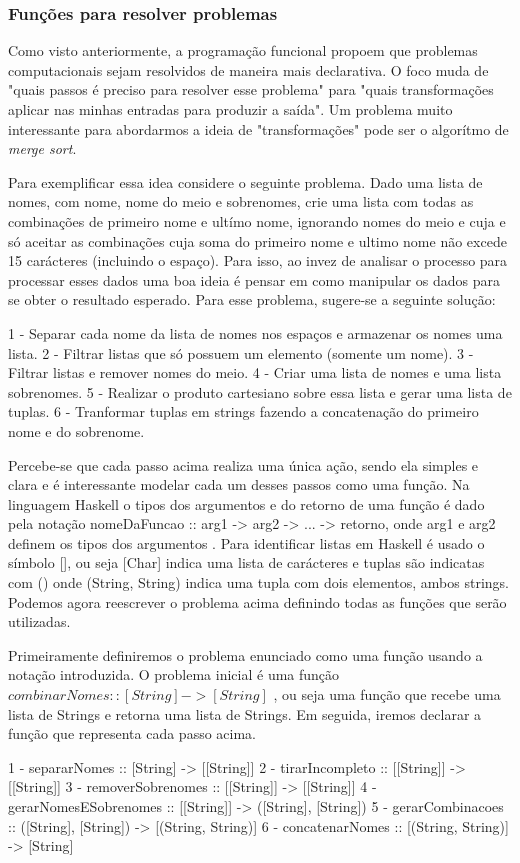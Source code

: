 \subsubsection{Funções para resolver problemas}

Como visto anteriormente, a programação funcional propoem que problemas computacionais sejam resolvidos de maneira mais declarativa.
O foco muda de "quais passos é preciso para resolver esse problema" para "quais transformações aplicar nas minhas entradas para produzir a saída".
Um problema muito interessante para abordarmos a ideia de "transformações" pode ser o algorítmo de \emph{merge sort}.

Para exemplificar essa idea considere o seguinte problema.
Dado uma lista de nomes, com nome, nome do meio e sobrenomes, crie uma lista com todas as combinações de primeiro nome e ultímo nome, ignorando nomes do meio e cuja e só aceitar as combinações cuja soma do primeiro nome e ultimo nome não excede 15 carácteres (incluindo o espaço).
Para isso, ao invez de analisar o processo para processar esses dados uma boa ideia é pensar em como manipular os dados para se obter o resultado esperado.
Para esse problema, sugere-se a seguinte solução:

1 - Separar cada nome da lista de nomes nos espaços e armazenar os nomes uma lista. 
2 - Filtrar listas que só possuem um elemento (somente um nome).
3 - Filtrar listas e remover nomes do meio.
4 - Criar uma lista de nomes e uma lista sobrenomes.
5 - Realizar o produto cartesiano sobre essa lista e gerar uma lista de tuplas.
6 - Tranformar tuplas em strings fazendo a concatenação do primeiro nome e do sobrenome.

Percebe-se que cada passo acima realiza uma única ação, sendo ela simples e clara e é interessante modelar cada um desses passos como uma função.
Na linguagem Haskell o tipos dos argumentos e do retorno de uma função é dado pela notação nomeDaFuncao :: arg1 -> arg2 -> ... -> retorno, onde arg1 e arg2 definem os tipos dos argumentos \cite{lipovaca}.
Para identificar listas em Haskell é usado o símbolo [], ou seja [Char] indica uma lista de carácteres e tuplas são indicatas com () onde (String, String) indica uma tupla com dois elementos, ambos strings.
Podemos agora reescrever o problema acima definindo todas as funções que serão utilizadas.

Primeiramente definiremos o problema enunciado como uma função usando a notação introduzida.
O problema inicial é uma função $combinarNomes :: [String] -> [String]$ , ou seja uma função que recebe uma lista de Strings e retorna uma lista de Strings.
Em seguida, iremos declarar a função que representa cada passo acima.

1 - separarNomes :: [String] -> [[String]]
2 - tirarIncompleto :: [[String]] -> [[String]]
3 - removerSobrenomes :: [[String]] -> [[String]]
4 - gerarNomesESobrenomes :: [[String]] -> ([String], [String])
5 - gerarCombinacoes :: ([String], [String]) -> [(String, String)]
6 - concatenarNomes :: [(String, String)] -> [String]

